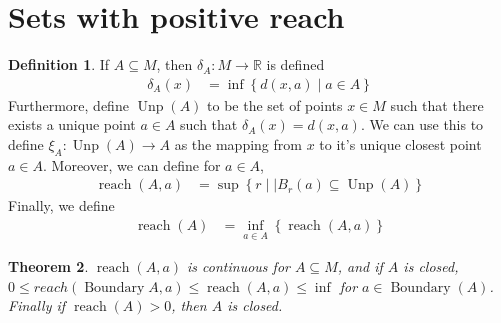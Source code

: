 \documentclass{article}
\theoremstyle{plain}
\newtheorem{thm}{Theorem}[section]
\theoremstyle{definition}
\newtheorem{defn}[thm]{Definition}
\renewcommand{\(}{\left(}
\renewcommand{\)}{\right)}
\newcommand{\R}{\mathbb R}
\DeclareMathOperator*{\reach}{reach}
\DeclareMathOperator*{\Unp}{Unp}
\DeclareMathOperator*{\boundary}{Boundary}
\begin{document}
\section{Sets with positive reach}
\begin{defn}
  If $A \subseteq M$, then $\delta_A: M \rightarrow \R$ is defined
  \begin{align*}
    \delta_A(x) &= \inf\left\{d(x,a) \middle\vert a \in A \right\}
  \end{align*}
  Furthermore, define $\Unp(A)$ to be the set of points $x \in M$ such that there exists a unique point $a \in A$ such that $\delta_A(x) = d(x,a)$.
  We can use this to define $\xi_A : \Unp(A) \rightarrow A$ as the mapping from $x$ to it's unique closest point $a \in A$.
  Moreover, we can define for $a \in A$,
  \begin{align*}
    \reach(A,a) &= \sup\left\{r \middle\vert \vert B_r(a) \subseteq \Unp(A) \right\}
  \end{align*}
  Finally, we define
  \begin{align*}
    \reach(A) &= \inf_{a \in A} \left\{\reach(A,a)\right\}
  \end{align*}
\end{defn}
\begin{thm}
  $\reach(A,a)$ is continuous for $A \subseteq M$, and if $A$ is closed, $0 \leq reach(\boundary{A}, a) \leq \reach(A,a) \leq \inf$ for $a \in \boundary(A)$. Finally if $\reach(A) > 0$, then $A$ is closed.
\end{thm}
\end{document}
